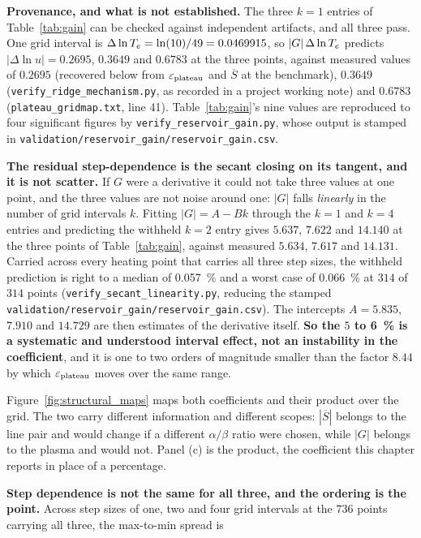 \textbf{Provenance, and what is not established.} The three $k=1$ entries of
Table~\ref{tab:gain} can be checked against independent artifacts, and all
three pass. One grid interval is
$\Delta\ln T_e = \ln(10)/49 = 0.0469915$, so
$|G|\,\Delta\ln T_e$ predicts $|\Delta\ln u| = 0.2695$, $0.3649$ and $0.6783$ at
the three points, against measured values of $0.2695$ (recovered below from
$\varepsilon_{\mathrm{plateau}}$ and $\overline{S}$ at the benchmark), $0.3649$
(\texttt{verify\_ridge\_mechanism.py}, as recorded in a project working
note) and $0.6783$
(\texttt{plateau\_gridmap.txt}, line 41). Table~\ref{tab:gain}'s nine values are reproduced to four significant figures by \texttt{verify\_reservoir\_gain.py}, whose output is stamped in \texttt{validation/reservoir\_gain/reservoir\_gain.csv}.

\textbf{The residual step-dependence is the secant closing on its tangent, and
it is not scatter.} If $G$ were a derivative it could not take three values at
one point, and the three values are not noise around one: $|G|$ falls
\emph{linearly} in the number of grid intervals $k$. Fitting $|G| = A - Bk$
through the $k=1$ and $k=4$ entries and predicting the withheld $k=2$ entry
gives $5.637$, $7.622$ and $14.140$ at the three points of
Table~\ref{tab:gain}, against measured $5.634$, $7.617$ and $14.131$. Carried
across every heating point that carries all three step sizes, the withheld
prediction is right to a median of \SI{0.057}{\percent} and a worst case of
\SI{0.066}{\percent} at $314$ of $314$ points
(\texttt{verify\_secant\_linearity.py}, reducing the stamped
\texttt{validation/reservoir\_gain/reservoir\_gain.csv}). The intercepts
$A = 5.835$, $7.910$ and $14.729$ are then estimates of the derivative itself.
\textbf{So the $5$ to \SI{6}{\percent} is a systematic and understood
interval effect, not an instability in the coefficient}, and it is one to two
orders of magnitude smaller than the factor $8.44$ by which $\varepsilon_{\mathrm{plateau}}$ moves
over the same range.

Figure~\ref{fig:structural_maps} maps both coefficients and their product over
the grid. The two carry different information and different scopes:
$|\overline{S}|$ belongs to the line pair and would change if a different
$\alpha/\beta$ ratio were chosen, while $|G|$ belongs to the plasma and would
not. Panel (c) is the product, the coefficient this chapter
reports in place of a percentage.

\textbf{Step dependence is not the same for all three, and the ordering is the
point.} Across step sizes of one, two and four grid intervals at the $736$
points carrying all three, the max-to-min spread is

